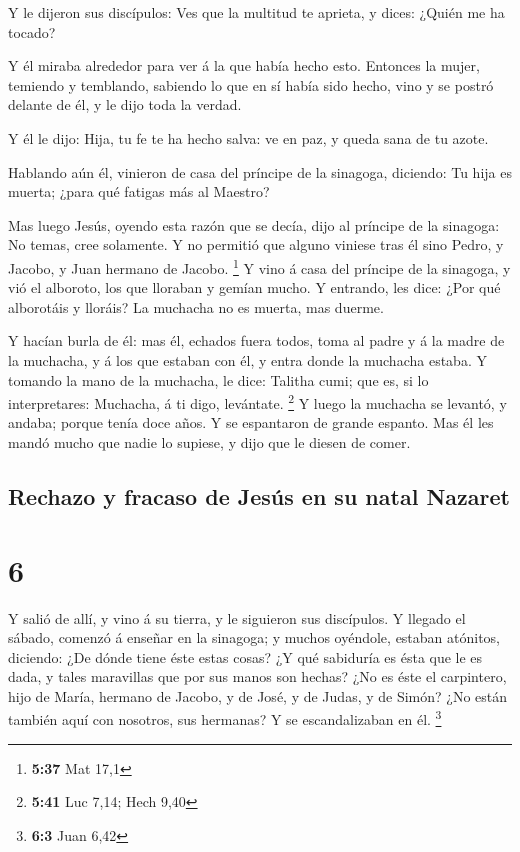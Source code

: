  Y le dijeron sus discípulos: Ves que la multitud te
aprieta, y dices: ¿Quién me ha tocado?

 Y él miraba alrededor para ver á la que había hecho
esto.  Entonces la mujer, temiendo y temblando, sabiendo
lo que en sí había sido hecho, vino y se postró delante de él, y le dijo
toda la verdad.

 Y él le dijo: Hija, tu fe te ha hecho salva: ve en paz,
y queda sana de tu azote.

 Hablando aún él, vinieron de casa del príncipe de la
sinagoga, diciendo: Tu hija es muerta; ¿para qué fatigas más al Maestro?

 Mas luego Jesús, oyendo esta razón que se decía, dijo al
príncipe de la sinagoga: No temas, cree solamente.  Y no
permitió que alguno viniese tras él sino Pedro, y Jacobo, y Juan hermano
de Jacobo. \footnote{\textbf{5:37} Mat 17,1}  Y vino á
casa del príncipe de la sinagoga, y vió el alboroto, los que lloraban y
gemían mucho.  Y entrando, les dice: ¿Por qué alborotáis
y lloráis? La muchacha no es muerta, mas duerme.

 Y hacían burla de él: mas él, echados fuera todos, toma
al padre y á la madre de la muchacha, y á los que estaban con él, y
entra donde la muchacha estaba.  Y tomando la mano de la
muchacha, le dice: Talitha cumi; que es, si lo interpretares: Muchacha,
á ti digo, levántate. \footnote{\textbf{5:41} Luc 7,14; Hech 9,40}
 Y luego la muchacha se levantó, y andaba; porque tenía
doce años. Y se espantaron de grande espanto.  Mas él les
mandó mucho que nadie lo supiese, y dijo que le diesen de comer.

\hypertarget{rechazo-y-fracaso-de-jesuxfas-en-su-natal-nazaret}{%
\subsection{Rechazo y fracaso de Jesús en su natal
Nazaret}\label{rechazo-y-fracaso-de-jesuxfas-en-su-natal-nazaret}}

\hypertarget{section-5}{%
\section{6}\label{section-5}}

 Y salió de allí, y vino á su tierra, y le siguieron sus
discípulos.  Y llegado el sábado, comenzó á enseñar en la
sinagoga; y muchos oyéndole, estaban atónitos, diciendo: ¿De dónde tiene
éste estas cosas? ¿Y qué sabiduría es ésta que le es dada, y tales
maravillas que por sus manos son hechas?  ¿No es éste el
carpintero, hijo de María, hermano de Jacobo, y de José, y de Judas, y
de Simón? ¿No están también aquí con nosotros, sus hermanas? Y se
escandalizaban en él. \footnote{\textbf{6:3} Juan 6,42}

